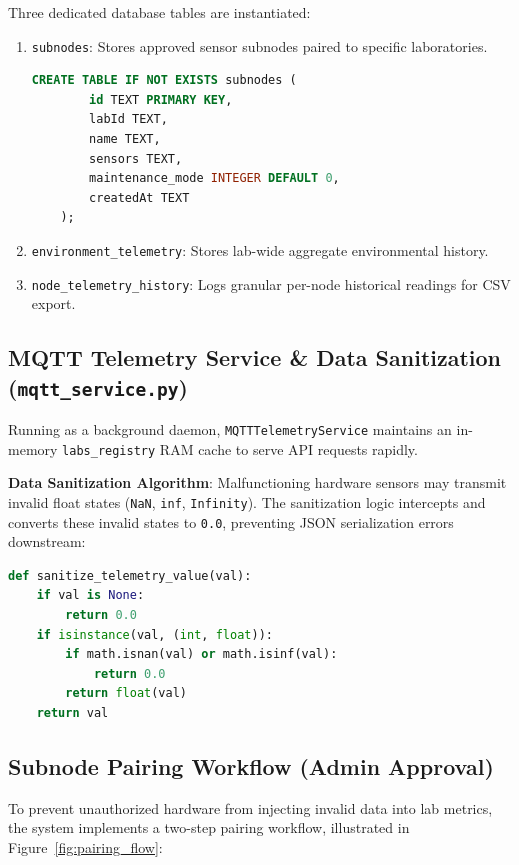 \documentclass[11pt,a4paper]{article}
\begin{document}
Three dedicated database tables are instantiated:
\begin{enumerate}
    \item \texttt{subnodes}: Stores approved sensor subnodes paired to specific laboratories.
    \begin{lstlisting}[language=SQL]
    CREATE TABLE IF NOT EXISTS subnodes (
        id TEXT PRIMARY KEY,
        labId TEXT,
        name TEXT,
        sensors TEXT,
        maintenance_mode INTEGER DEFAULT 0,
        createdAt TEXT
    );
    \end{lstlisting}
    \item \texttt{environment\_telemetry}: Stores lab-wide aggregate environmental history.
    \item \texttt{node\_telemetry\_history}: Logs granular per-node historical readings for CSV export.
\end{enumerate}

\subsection{MQTT Telemetry Service \& Data Sanitization (\texttt{mqtt\_service.py})}
Running as a background daemon, {\small\texttt{MQTTTelemetryService}} maintains an in-memory \texttt{labs\_registry} RAM cache to serve API requests rapidly.

\textbf{Data Sanitization Algorithm}: Malfunctioning hardware sensors may transmit invalid float states (\texttt{NaN}, \texttt{inf}, \texttt{Infinity}). The sanitization logic intercepts and converts these invalid states to \texttt{0.0}, preventing JSON serialization errors downstream:
\begin{lstlisting}[language=Python, caption={Data sanitization logic converting invalid float values in Python backend.}]
def sanitize_telemetry_value(val):
    if val is None:
        return 0.0
    if isinstance(val, (int, float)):
        if math.isnan(val) or math.isinf(val):
            return 0.0
        return float(val)
    return val
\end{lstlisting}

\subsection{Subnode Pairing Workflow (Admin Approval)}
To prevent unauthorized hardware from injecting invalid data into lab metrics, the system implements a two-step pairing workflow, illustrated in Figure~\ref{fig:pairing_flow}:
\end{document}
